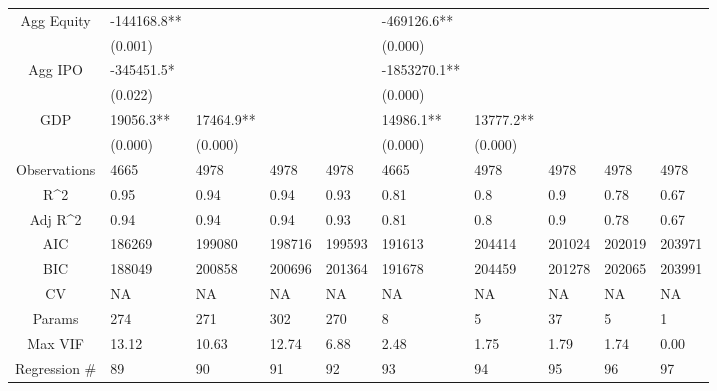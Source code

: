 \documentclass{article}
\begin{document}
\begin{table}[H]
\begin{tabular}{|clllllllll|}
  Agg Equity & -144168.8** &  &  &  & -469126.6** &  &  &  &  \\ 
   & (0.001) &  &  &  & (0.000) &  &  &  &  \\ 
  Agg IPO & -345451.5* &  &  &  & -1853270.1** &  &  &  &  \\ 
   & (0.022) &  &  &  & (0.000) &  &  &  &  \\ 
  GDP & 19056.3** & 17464.9** &  &  & 14986.1** & 13777.2** &  &  &  \\ 
   & (0.000) & (0.000) &  &  & (0.000) & (0.000) &  &  &  \\ 
  \hline 
 Observations & 4665 & 4978 & 4978 & 4978 & 4665 & 4978 & 4978 & 4978 & 4978 \\ 
  R^2 & 0.95 & 0.94 & 0.94 & 0.93 & 0.81 & 0.8 & 0.9 & 0.78 & 0.67 \\ 
  Adj R^2 & 0.94 & 0.94 & 0.94 & 0.93 & 0.81 & 0.8 & 0.9 & 0.78 & 0.67 \\ 
  AIC & 186269 & 199080 & 198716 & 199593 & 191613 & 204414 & 201024 & 202019 & 203971 \\ 
  BIC & 188049 & 200858 & 200696 & 201364 & 191678 & 204459 & 201278 & 202065 & 203991 \\ 
  CV & NA & NA & NA & NA & NA & NA & NA & NA & NA \\ 
  Params & 274 & 271 & 302 & 270 & 8 & 5 & 37 & 5 & 1 \\ 
  Max VIF & 13.12 & 10.63 & 12.74 & 6.88 & 2.48 & 1.75 & 1.79 & 1.74 & 0.00 \\ 
  Regression \# & 89 & 90 & 91 & 92 & 93 & 94 & 95 & 96 & 97 \\ 
   \hline
\end{tabular}
 
\end{table}
\end{document}
